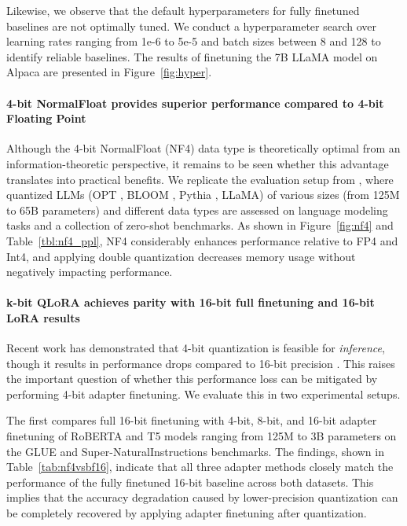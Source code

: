 Likewise, we observe that the default hyperparameters for fully finetuned baselines are not optimally tuned. We conduct a hyperparameter search over learning rates ranging from 1e-6 to 5e-5 and batch sizes between 8 and 128 to identify reliable baselines. The results of finetuning the 7B LLaMA model on Alpaca are presented in Figure~\ref{fig:hyper}.

\paragraph{4-bit NormalFloat provides superior performance compared to 4-bit Floating Point}

Although the 4-bit NormalFloat (NF4) data type is theoretically optimal from an information-theoretic perspective, it remains to be seen whether this advantage translates into practical benefits. We replicate the evaluation setup from \citet{dettmers2022case}, where quantized LLMs (OPT \citep{zhang2022opt}, BLOOM \cite{scao2022bloom}, Pythia \cite{biderman2023pythia}, LLaMA) of various sizes (from 125M to 65B parameters) and different data types are assessed on language modeling tasks and a collection of zero-shot benchmarks. As shown in Figure~\ref{fig:nf4} and Table~\ref{tbl:nf4_ppl}, NF4 considerably enhances performance relative to FP4 and Int4, and applying double quantization decreases memory usage without negatively impacting performance.

\paragraph{k-bit \textsc{QLoRA} achieves parity with 16-bit full finetuning and 16-bit LoRA results} Recent work has demonstrated that 4-bit quantization is feasible for \emph{inference}, though it results in performance drops compared to 16-bit precision \citep{dettmers2022case,frantar2022gptq}. This raises the important question of whether this performance loss can be mitigated by performing 4-bit adapter finetuning. We evaluate this in two experimental setups.

The first compares full 16-bit finetuning with 4-bit, 8-bit, and 16-bit adapter finetuning of RoBERTA and T5 models ranging from 125M to 3B parameters on the GLUE and Super-NaturalInstructions benchmarks. The findings, shown in Table~\ref{tab:nf4vsbf16}, indicate that all three adapter methods closely match the performance of the fully finetuned 16-bit baseline across both datasets. This implies that the accuracy degradation caused by lower-precision quantization can be completely recovered by applying adapter finetuning after quantization.

